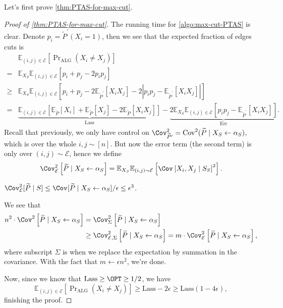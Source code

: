 Let's first prove \autoref{thm:PTAS-for-max-cut}.

\begin{proof}[Proof of \autoref{thm:PTAS-for-max-cut}]
	The running time for \autoref{algo:max-cut-PTAS} is clear. Denote \(p_i = \widetilde{P} ^\prime (X_i = 1)\), then we see that the expected fraction of edges cuts is
	\[
		\begin{split}
			&\mathbb{E}_{(i, j)\in \mathcal{E} }\left[ \Pr\nolimits_{\mathrm{ALG}}(X_i \neq X_j) \right]\\
			=& \mathbb{E}_{X_S}\mathbb{E}_{(i, j)\in \mathcal{E} }\left[p_i + p_j - 2 p_i p_j \right]\\
			\geq& \mathbb{E}_{X_S}\mathbb{E}_{(i, j)\in \mathcal{E} }\left[ p_i + p_j - 2 \mathbb{E}_{\widetilde{P} ^\prime }\left[X_i X_j \right] - 2 \left\vert p_i p_j - \mathbb{E}_{\widetilde{P} ^\prime }\left[X_i X_j \right]  \right\vert  \right]\\
			=& \underbrace{\mathbb{E}_{(i, j)\in \mathcal{E} }\left[ \mathbb{E}_{\widetilde{P} }\left[X_i \right] + \mathbb{E}_{\widetilde{P} }\left[X_j \right] - 2 \mathbb{E}_{\widetilde{P} }\left[ X_i X_j\right]  \right]}_{\mathrm{Lass}} - \underbrace{2 \mathbb{E}_{X_S} \mathbb{E}_{(i, j)\in \mathcal{E} }\left[ p_i p_j - \mathbb{E}_{\widetilde{P} ^\prime }\left[ X_i X_j\right] \right]}_{\mathrm{Err}}.
		\end{split}
	\]
	Recall that previously, we only have control on \(\Cov_{\widetilde{P} ^\prime }^{2} = \mathop{\mathrm{Cov}}^2(\widetilde{P} \mid X_S\gets \alpha _S)\), which is over the whole \(i, j\sim[n]\). But now the error term (the second term) is only over \((i, j)\sim \mathcal{E} \), hence we define
	\[
		\Cov_{\mathcal{E} }^2\left[ \widetilde{P} \mid X_S \gets \alpha _S\right]
		= \mathbb{E}_{X_S} \mathbb{E}_{(i, j)\sim \mathcal{E} }\left[ \Cov_{}\left[X_i , X_j \mid S_S \right]^{2}\right].
	\]
	\begin{claim}
		\(\Cov_{\mathcal{E} }^2 [ \widetilde{P} \mid S ] \leq \Cov_{}[\widetilde{P} \mid X_S \gets \alpha _S ] / \epsilon \leq \epsilon ^3 \).
	\end{claim}
	\begin{explanation}
		We see that
		\[
			\begin{split}
				n^2\cdot \Cov_{}^2\left[\widetilde{P} \mid X_S \gets \alpha _S \right]
				&= \Cov_{\Sigma }^2\left[\widetilde{P} \mid X_S\gets \alpha _S \right] \\
				&\geq \Cov_{\mathcal{E} , \Sigma }^2\left[\widetilde{P} \mid X_S\gets \alpha _S \right]
				= m \cdot \Cov_{\mathcal{E} }^2\left[\widetilde{P} \mid X_S \gets \alpha _S \right],
			\end{split}
		\]
		where subscript \(\Sigma \) is when we replace the expectation by summation in the covariance. With the fact that \(m\gets \epsilon n^2\), we're done.
	\end{explanation}
	Now, since we know that \(\mathrm{Lass} \geq \OPT \geq 1 / 2\), we have
	\[
		\mathbb{E}_{(i, j)\in \mathcal{E} }\left[ \Pr\nolimits_{\mathrm{ALG}}(X_i \neq X_j) \right]
		\geq \mathrm{Lass} - 2 \epsilon \geq \mathrm{Lass}(1 - 4 \epsilon ),
	\]
	finishing the proof.
\end{proof}

